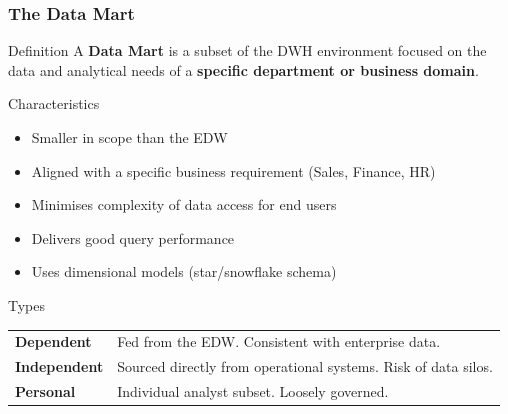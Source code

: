 \begin{frame}
  \frametitle{The Data Mart}

  \begin{block}{Definition}
    A \textbf{Data Mart} is a subset of the DWH environment focused on the
    data and analytical needs of a \textbf{specific department or business domain}.
  \end{block}

  \begin{block}{Characteristics}
    \begin{itemize}
      \item Smaller in scope than the EDW
      \item Aligned with a specific business requirement (Sales, Finance, HR)
      \item Minimises complexity of data access for end users
      \item Delivers good query performance
      \item Uses dimensional models (star/snowflake schema)
    \end{itemize}
  \end{block}

  \begin{block}{Types}
    \begin{tabularx}{\linewidth}{@{}l X@{}}
      \textbf{Dependent}   & Fed from the EDW. Consistent with enterprise data. \\
      \textbf{Independent} & Sourced directly from operational systems. Risk of data silos. \\
      \textbf{Personal}    & Individual analyst subset. Loosely governed. \\
    \end{tabularx}
  \end{block}
\end{frame}


